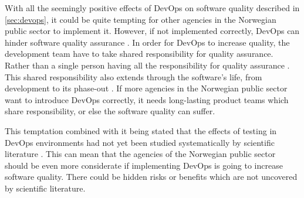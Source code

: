
With all the seemingly positive effects of DevOps on software quality described in \autoref{sec:devops}, it could be quite tempting for other agencies in the Norwegian public sector to implement it. However, if not implemented correctly, DevOps can hinder software quality assurance \cite{dsc_2019}. In order for DevOps to increase quality, the development team have to take shared responsibility for quality assurance. Rather than a single person having all the responsibility for quality assurance \cite{dsc_2019}. This shared responsibility also extends through the software's life, from development to its phase-out \cite{dsc_2019}. If more agencies in the Norwegian public sector want to introduce DevOps correctly, it needs long-lasting product teams which share responsibility, or else the software quality can suffer.


This temptation combined with it being stated that the effects of testing in DevOps environments had not yet been studied systematically by scientific literature \cite{dsc_2019}\cite{ja_2016}. This can mean that the agencies of the Norwegian public sector should be even more considerate if implementing DevOps is going to increase software quality. There could be hidden risks or benefits which are not uncovered by scientific literature.


